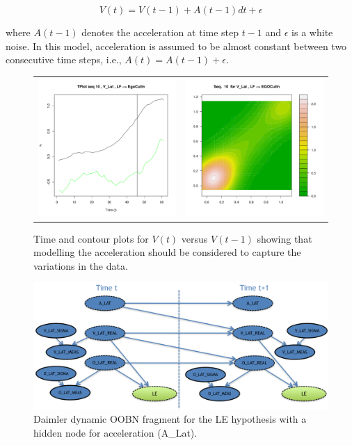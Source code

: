 \begin{equation}
V(t) =V(t-1) +A(t-1)dt +\epsilon
\end{equation}

\noindent where $A(t-1)$ denotes the acceleration at time step $t-1$ and $\epsilon$ is a white noise. In this model, acceleration is assumed to be almost constant between two consecutive time steps, i.e., $A(t) = A(t-1) + \epsilon$. 

\begin{figure}[ht!]
  \centering
  \setlength{\tabcolsep}{0.05pt}
  \renewcommand{\arraystretch}{0.02}
    \begin{tabular}{cc}
    \includegraphics[width=60mm]{figures/DaimlerLE_EGO_L_LE_OBJ_R_EGOCutInVel.pdf}&
    \includegraphics[width=60mm]{figures/DaimlerBivariate_temporal_analysisEGO_LVel.pdf}\\
  \end{tabular}
      \caption{ \label{Figure:daimlerVel}Time and contour plots for $V(t)$ versus $V(t-1)$ showing that modelling the acceleration should be considered to capture the variations in the data.}
\end{figure}

\begin{figure}[ht!]
\begin{center}
\includegraphics[scale=0.48]{./figures/DaimlertempDynAccel}
\end{center}
\caption{\label{Figure:tempDynAccel}Daimler dynamic OOBN fragment for the LE hypothesis with a hidden node for acceleration (A\_Lat).}
\end{figure}